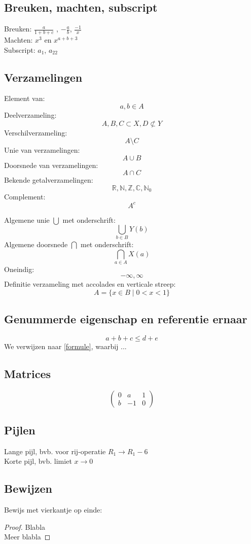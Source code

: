 \documentclass[a4paper]{article}
\begin{document}
\subsection*{Breuken, machten, subscript}
Breuken: $\frac{a}{1+b+c}$ , $-\frac{a}{b}$, $\frac{-1}{x}$ \\
Machten: $x^3$ en $x^{a+b+3}$ \\
Subscript: $a_1$, $a_{22}$

\subsection*{Verzamelingen}
Element van: \[a, b \in A\]
Deelverzameling: \[A,B,C \subset X , D \not\subset Y \] 
Verschilverzameling: \[A \setminus C\] 
Unie van verzamelingen: \[A \cup B\] 
Doorsnede van verzamelingen: \[A \cap C\] 
Bekende getalverzamelingen: \[\mathbb{R}, \mathbb{N}, \mathbb{Z}, \mathbb{C}, \mathbb{N}_0 \] 
Complement: \[ A^c \]


Algemene unie $\bigcup$ met onderschrift: 
\[ \bigcup_{b \in B} Y(b) \] 
Algemene doorsnede $\bigcap$ met onderschrift:  
\[ \bigcap_{a \in A} X(a) \] 
Oneindig: 
\[ -\infty , \infty   \]
Definitie verzameling met accolades en verticale streep: 
\[ A = \{x \in B \mid 0<x<1\} \]

\subsection*{Genummerde eigenschap en referentie ernaar}
\begin{equation}\label{formule}
a + b + c \leq d + e 
\end{equation}
We verwijzen naar \ref{formule}, waarbij ...

\subsection*{Matrices}
\[ \begin{pmatrix}
0 & a & 1\\
b & -1 & 0
\end{pmatrix}\]


\subsection*{Pijlen}
Lange pijl, bvb. voor rij-operatie $R_1 \longrightarrow R_1 - 6$ \\
Korte pijl, bvb. limiet $x \rightarrow 0$ 

\subsection*{Bewijzen}
Bewijs met vierkantje op einde: 
\begin{proof}
Blabla \\
Meer blabla
\end{proof}
\end{document}
